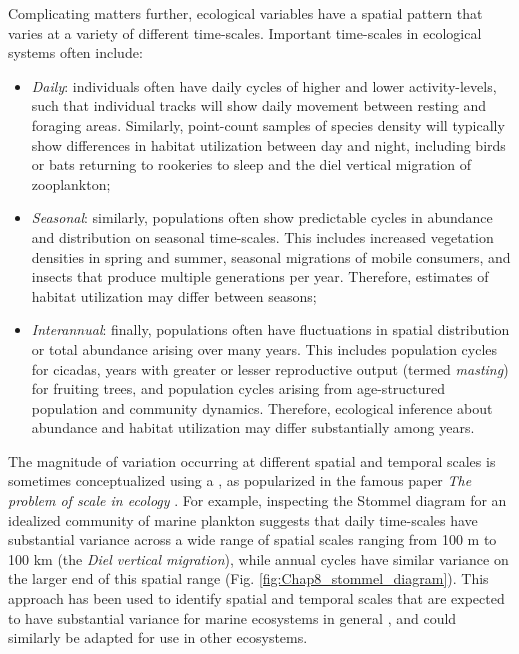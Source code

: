 Complicating matters further, ecological variables have a spatial pattern that varies at a variety of different time-scales.  Important time-scales in ecological systems often include:
\begin{itemize}
    \item \textit{Daily}:  individuals often have daily cycles of higher and lower activity-levels, such that individual tracks will show daily movement between resting and foraging areas.  Similarly, point-count samples of species density will typically show differences in habitat utilization between day and night, including birds or bats returning to rookeries to sleep and the diel vertical migration of zooplankton;

    \item \textit{Seasonal}:  similarly, populations often show predictable cycles in abundance and distribution on seasonal time-scales.  This includes increased vegetation densities in spring and summer, seasonal migrations of mobile consumers, and insects that produce multiple generations per year. Therefore, estimates of habitat utilization may differ between seasons;
    
    \item \textit{Interannual}:  finally, populations often have fluctuations in spatial distribution or total abundance arising over many years.  This includes population cycles for cicadas, years with greater or lesser reproductive output (termed \textit{masting}) for fruiting trees, and population cycles arising from age-structured population and community dynamics.  Therefore, ecological inference about abundance and habitat utilization may differ substantially among years.
\end{itemize}
The magnitude of variation occurring at different spatial and temporal scales is sometimes conceptualized using a  \cite{stommel_varieties_1963}, as popularized in the famous paper \textit{The problem of scale in ecology} \cite{levin_problem_1992}.  For example, inspecting the Stommel diagram for an idealized community of marine plankton \cite{haury_patterns_1978} suggests that daily time-scales have substantial variance across a wide range of spatial scales ranging from 100 m to 100 km (the \textit{Diel vertical migration}), while annual cycles have similar variance on the larger end of this spatial range (Fig. \ref{fig:Chap8_stommel_diagram}).  This approach has been used to identify spatial and temporal scales that are expected to have substantial variance for marine ecosystems in general \cite{hazen_scales_2013}, and could similarly be adapted for use in other ecosystems.

